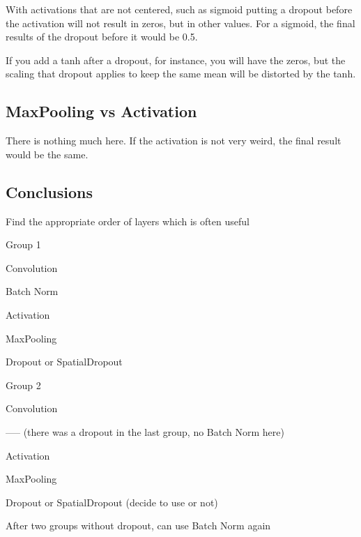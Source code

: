 With activations that are not centered, such as sigmoid putting a dropout before the activation will not result in zeros, but in other values.  For a sigmoid, the final results of the dropout before it would be 0.5.

If you add a tanh after a dropout, for instance, you will have the zeros, but the scaling that dropout applies to keep the same mean will be distorted by the tanh.

	\subsection{MaxPooling vs Activation}
There is nothing much here. If the activation is not very weird, the final result would be the same.

	\subsection{Conclusions}
Find the appropriate order of layers which is often useful
	\begin{bulletedlist}
	\item Group 1
		\begin{bulletedlist}
			\item Convolution
			\item Batch Norm
			\item Activation
			\item MaxPooling
			\item Dropout or SpatialDropout
		\end{bulletedlist}
	\item Group 2
		\begin{bulletedlist}
			\item Convolution
			\item ----- (there was a dropout in the last group, no Batch Norm here)
			\item Activation
			\item MaxPooling
			\item Dropout or SpatialDropout (decide to use or not)
			\item After two groups without dropout, can use Batch Norm again
		\end{bulletedlist}
	\end{bulletedlist}